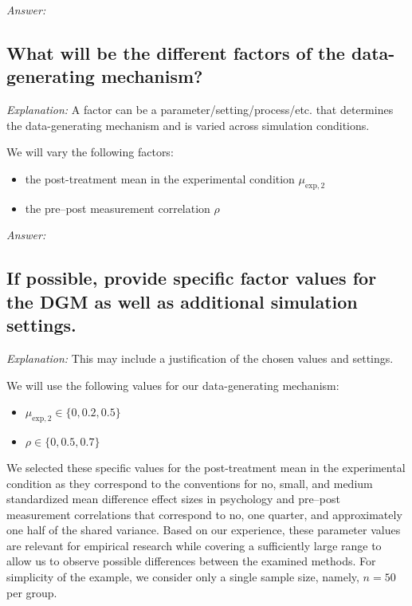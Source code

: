 \documentclass[12pt]{article}
\begin{document}
\textit{Answer:}

\subsection{What will be the different factors of the data-generating mechanism?}

\textit{Explanation:} A factor can be a parameter/setting/process/etc. that determines the data-generating mechanism and is varied across simulation conditions.

\begin{examplebox}
We will vary the following factors:
\begin{itemize}
    \item the post-treatment mean in the experimental condition ${\mu_{\text{exp},2}}$
    \item the pre--post measurement correlation $\rho$
\end{itemize}
\end{examplebox}

\textit{Answer:}

\subsection{If possible, provide specific factor values for the DGM as well as additional simulation settings.}

\textit{Explanation:} This may include a justification of the chosen values and settings.

\begin{examplebox}
We will use the following values for our data-generating mechanism:
\begin{itemize}
        \item ${\mu_{\text{exp},2}} \in \{0, 0.2, 0.5\}$
        \item $\rho \in \{0, 0.5, 0.7\}$
\end{itemize}
We selected these specific values for the post-treatment mean in the experimental condition as they correspond to the conventions for no, small, and medium standardized mean difference effect sizes in psychology \parencite{Cohen1988} and pre--post measurement correlations that correspond to no, one quarter, and approximately one half of the shared variance. Based on our experience, these parameter values are relevant for empirical research while covering a sufficiently large range to allow us to observe possible differences between the examined methods. For simplicity of the example, we consider only a single sample size, namely, $n = 50$ per group.
\end{examplebox}
\end{document}
